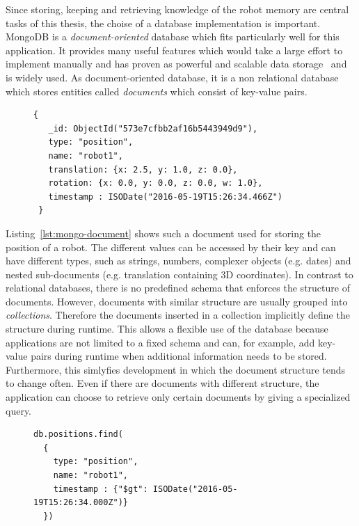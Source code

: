 \documentclass[a4paper,11pt]{article}
\newcommand{\reflst}[1]{Listing~\ref{#1}}
\begin{document}
Since storing, keeping and retrieving knowledge of the robot memory
are central tasks of this thesis, the choise of a database
implementation is important. MongoDB is a \emph{document-oriented}
database which fits particularly well for this application. It
provides many useful features which would take a large effort to
implement manually and has proven as powerful and scalable data
storage~\cite{mongodb,RoboDB} and is widely used. As document-oriented
database, it is a non relational database which stores entities called
\emph{documents} which consist of key-value pairs.
\begin{figure}
\begin{lstlisting}[style=SmallJSON,
  caption={MongoDB document representing the position of a robot},
  label=lst:mongo-document,
  framexleftmargin=15pt, xleftmargin=15pt,
 morekeywords={}]
 {
   _id: ObjectId("573e7cfbb2af16b5443949d9"),
   type: "position",
   name: "robot1",
   translation: {x: 2.5, y: 1.0, z: 0.0},
   rotation: {x: 0.0, y: 0.0, z: 0.0, w: 1.0},
   timestamp : ISODate("2016-05-19T15:26:34.466Z")
 }
\end{lstlisting}
\end{figure}
 \reflst{lst:mongo-document} shows such
a document used for storing the position of a robot. The different
values can be accessed by their key and can have different types, such
as strings, numbers, complexer objects (e.g. dates) and nested
sub-documents (e.g. translation containing 3D coordinates). In
contrast to relational databases, there is no predefined schema that
enforces the structure of documents. However, documents with similar
structure are usually grouped into \emph{collections}. Therefore the
documents inserted in a collection implicitly define the structure
during runtime. This allows a flexible use of the database because
applications are not limited to a fixed schema and can, for example,
add key-value pairs during runtime when additional information needs
to be stored. Furthermore, this simlyfies development in which the
document structure tends to change often. Even if there are documents
with different structure, the application can choose to retrieve only
certain documents by giving a specialized query.
\begin{figure}
\begin{lstlisting}[style=SmallJSON,
  caption={MongoDB query retrieving the document shown in \reflst{lst:mongo-document}},
  label=lst:mongo-query,
  framexleftmargin=15pt, xleftmargin=15pt,
 morekeywords={}]
db.positions.find(
  {
    type: "position",
    name: "robot1",
    timestamp : {"$gt": ISODate("2016-05-19T15:26:34.000Z")}
  })
\end{lstlisting}
\end{figure}
\end{document}
